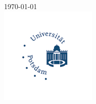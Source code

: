 \begin{titlepage}
    
    {\large \today}\\[2cm] %
    
    
    \includegraphics{./Graphics/Uni Potsdam.png}\\[0.9cm] %
     
    
    \vfill %
    
    \end{titlepage}